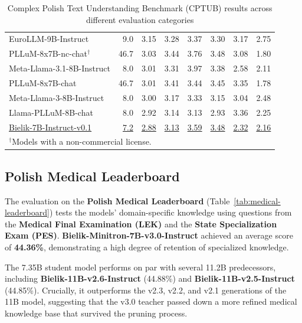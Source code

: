 \documentclass{article}
\begin{document}
\begin{table}[t]
\begin{tabular}{lrcccccc}
    EuroLLM-9B-Instruct & 9.0 & 3.15 & 3.28 & 3.37 & 3.30 & 3.17 & 2.75 \\
    PLLuM-8x7B-nc-chat$^{\dagger}$ & 46.7 & 3.03 & 3.44 & 3.76 & 3.48 & 3.08 & 1.80 \\
    Meta-Llama-3.1-8B-Instruct & 8.0 & 3.01 & 3.31 & 3.97 & 3.38 & 2.58 & 2.11 \\
    PLLuM-8x7B-chat & 46.7 & 3.01 & 3.41 & 3.44 & 3.45 & 3.35 & 1.78 \\
    Meta-Llama-3-8B-Instruct & 8.0 & 3.00 & 3.17 & 3.33 & 3.15 & 3.04 & 2.48 \\
    Llama-PLLuM-8B-chat & 8.0 & 2.92 & 3.14 & 3.13 & 2.93 & 3.36 & 2.25 \\
    \underline{Bielik-7B-Instruct-v0.1} & \underline{7.2} & \underline{2.88} & \underline{3.13} & \underline{3.59} & \underline{3.48} & \underline{2.32} & \underline{2.16} \\
    \bottomrule
    \multicolumn{8}{l}{$^{\dagger}$Models with a non-commercial license.} \\
    \end{tabular}
    \caption{Complex Polish Text Understanding Benchmark (CPTUB) results across different evaluation categories}
    \label{tab:cptub}
\end{table}

\subsection{Polish Medical Leaderboard}
The evaluation on the \textbf{Polish Medical Leaderboard} (Table~\ref{tab:medical-leaderboard}) tests the models' domain-specific knowledge using questions from the \textbf{Medical Final Examination (LEK)} and the \textbf{State Specialization Exam (PES)}. \textbf{Bielik-Minitron-7B-v3.0-Instruct} achieved an average score of \textbf{44.36\%}, demonstrating a high degree of retention of specialized knowledge.

The 7.35B student model performs on par with several 11.2B predecessors, including \textbf{Bielik-11B-v2.6-Instruct} (44.88\%) and \textbf{Bielik-11B-v2.5-Instruct} (44.85\%). Crucially, it outperforms the v2.3, v2.2, and v2.1 generations of the 11B model, suggesting that the v3.0 teacher passed down a more refined medical knowledge base that survived the pruning process.
\end{document}
